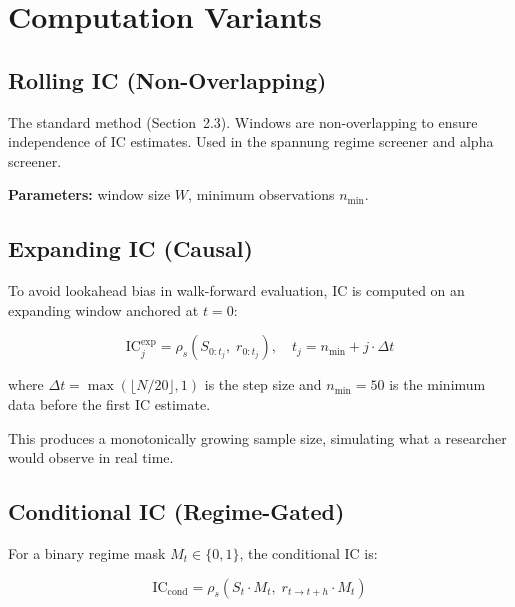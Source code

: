 \documentclass[11pt,a4paper]{article}
\begin{document}
\section{Computation Variants}

\subsection{Rolling IC (Non-Overlapping)}

The standard method (Section~2.3). Windows are non-overlapping to ensure
independence of IC estimates. Used in the spannung regime screener and
alpha screener.

\textbf{Parameters:} window size $W$, minimum observations $n_{\min}$.

\subsection{Expanding IC (Causal)}

To avoid lookahead bias in walk-forward evaluation, IC is computed on an
expanding window anchored at $t = 0$:

\begin{equation}
    \mathrm{IC}^{\mathrm{exp}}_j = \rho_s\!\left(
        S_{0:t_j},\; r_{0:t_j}
    \right), \quad
    t_j = n_{\min} + j \cdot \Delta t
    \label{eq:expanding_ic}
\end{equation}

where $\Delta t = \max(\lfloor N/20 \rfloor, 1)$ is the step size and
$n_{\min} = 50$ is the minimum data before the first IC estimate.

This produces a monotonically growing sample size, simulating what a
researcher would observe in real time.

\subsection{Conditional IC (Regime-Gated)}

For a binary regime mask $M_t \in \{0, 1\}$, the conditional IC is:

\begin{equation}
    \mathrm{IC}_{\mathrm{cond}} = \rho_s\!\left(
        S_t \cdot M_t,\; r_{t \to t+h} \cdot M_t
    \right)
    \label{eq:conditional_ic}
\end{equation}
\end{document}
